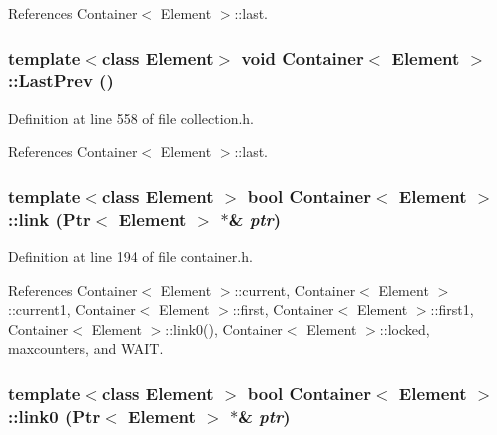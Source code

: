 References Container$<$ Element $>$::last.\hypertarget{classContainer_b5276a9d4e1d741f0d12379cc6122d7a}{
\subsubsection[{LastPrev}]{\setlength{\rightskip}{0pt plus 5cm}template$<$class Element$>$ void {\bf Container}$<$ Element $>$::LastPrev ()}}
\label{classContainer_b5276a9d4e1d741f0d12379cc6122d7a}




Definition at line 558 of file collection.h.

References Container$<$ Element $>$::last.\hypertarget{classContainer_a8a90e10da8c1b180a2863cd127539ec}{
\subsubsection[{link}]{\setlength{\rightskip}{0pt plus 5cm}template$<$class Element $>$ bool {\bf Container}$<$ Element $>$::link ({\bf Ptr}$<$ Element $>$ $\ast$\& {\em ptr})}}
\label{classContainer_a8a90e10da8c1b180a2863cd127539ec}




Definition at line 194 of file container.h.

References Container$<$ Element $>$::current, Container$<$ Element $>$::current1, Container$<$ Element $>$::first, Container$<$ Element $>$::first1, Container$<$ Element $>$::link0(), Container$<$ Element $>$::locked, maxcounters, and WAIT.\hypertarget{classContainer_5600e2f47bcd369f228a70f131f2eff6}{
\subsubsection[{link0}]{\setlength{\rightskip}{0pt plus 5cm}template$<$class Element $>$ bool {\bf Container}$<$ Element $>$::link0 ({\bf Ptr}$<$ Element $>$ $\ast$\& {\em ptr})}}
\label{classContainer_5600e2f47bcd369f228a70f131f2eff6}




